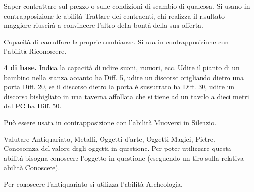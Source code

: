 
 \fi

 Saper contrattare sul prezzo o sulle condizioni
di scambio di qualcosa. Si usano in contrapposizione le abilit\`a
Trattare dei contraenti, chi realizza il risultato maggiore riuscir\`a
a convincere l'altro della bont\`a della sua offerta.

\iffullversion
{} Capacit\`a di camuffare le proprie
sembianze. Si usa in contrapposizione con l'abilit\`a Riconoscere.
\fi

 \textbf{4 di base.} Indica la capacit\`a di udire
suoni, rumori, ecc.  Udire il pianto di un bambino nella stanza
accanto ha Diff. 5, udire un discorso origliando dietro una porta
Diff. 20, se il discorso dietro la porta \`e sussurrato ha Diff. 30,
udire un discorso bisbigliato in una taverna affollata che si tiene ad
un tavolo a dieci metri dal PG ha Diff. 50. 

Pu\`o essere usata in contrapposizione con l'abilit\`a Muoversi in
Silenzio.

\iffullversion
{} Valutare Antiquariato, Metalli, Oggetti d'arte,
Oggetti Magici, Pietre. Conoscenza del valore degli oggetti in
questione. Per poter utilizzare questa abilit\`a bisogna conoscere
l'oggetto in questione (eseguendo un tiro sulla relativa abilit\`a
Conoscere).  

Per conoscere l'antiquariato si utilizza l'abilit\`a Archeologia.  

